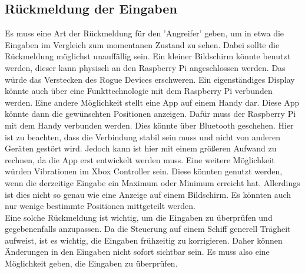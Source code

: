 \subsection{Rückmeldung der Eingaben}
Es muss eine Art der Rückmeldung für den 'Angreifer' geben, um in etwa die Eingaben im Vergleich zum momentanen Zustand zu sehen.
Dabei sollte die Rückmeldung möglichst unauffällig sein. Ein kleiner Bildschirm könnte benutzt werden, dieser kann 
physisch an den Raspberry Pi angeschlossen werden. Das würde das Verstecken des Rogue Devices erschweren.
Ein eigenständiges Display könnte auch über eine Funkttechnologie mit dem Raspberry Pi verbunden werden.
Eine andere Möglichkeit stellt eine App auf einem Handy dar. Diese App könnte dann die gewünschten Positionen anzeigen.
Dafür muss der Raspberry Pi mit dem Handy verbunden werden. Dies könnte über Bluetooth geschehen.
Hier ist zu beachten, dass die Verbindung stabil sein muss und nicht von anderen Geräten gestört wird.
Jedoch kann ist hier mit einem größeren Aufwand zu rechnen, da die App erst entwickelt werden muss.
Eine weitere Möglichkeit würden Vibrationen im Xbox Controller sein. Diese könnten genutzt werden, wenn die derzeitige
Eingabe ein Maximum oder Minimum erreicht hat. Allerdings ist dies nicht so genau wie eine Anzeige auf einem Bildschirm.
Es könnten auch nur wenige bestimmte Positionen mittgeteilt werden. \\
Eine solche Rückmeldung ist wichtig, um die Eingaben zu überprüfen und gegebenenfalls anzupassen.
Da die Steuerung auf einem Schiff generell Trägheit aufweist, ist es wichtig, die Eingaben frühzeitig zu korrigieren.
Daher können Änderungen in den Eingaben nicht sofort sichtbar sein. Es muss also eine Möglichkeit geben, die Eingaben
zu überprüfen.
